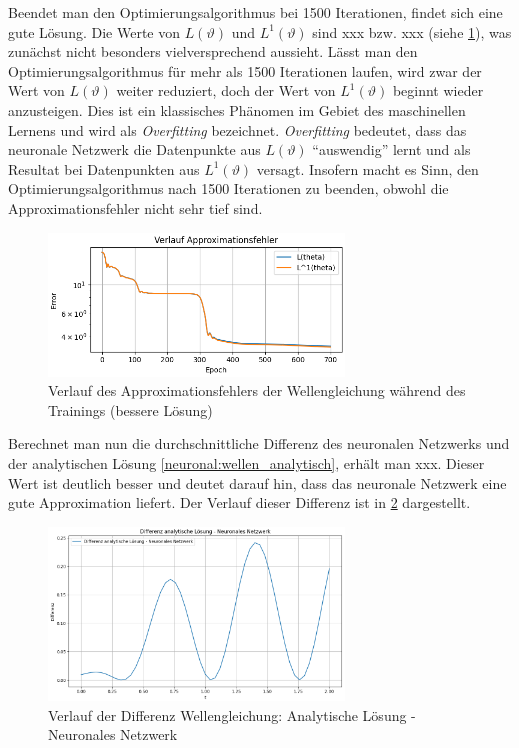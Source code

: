 Beendet man den Optimierungsalgorithmus bei 1500 Iterationen, findet sich eine gute Lösung.
Die Werte von $L(\vartheta)$ und $L^1(\vartheta)$ sind xxx bzw. xxx (siehe \ref{fig:fehler_wave_good}), was zunächst nicht besonders vielversprechend aussieht.
Lässt man den Optimierungsalgorithmus für mehr als 1500 Iterationen laufen, wird zwar der Wert von $L(\vartheta)$ weiter reduziert, doch der Wert von $L^1(\vartheta)$ beginnt wieder anzusteigen.
Dies ist ein klassisches Phänomen im Gebiet des maschinellen Lernens und wird als \emph{Overfitting} bezeichnet.
\emph{Overfitting} bedeutet, dass das neuronale Netzwerk die Datenpunkte aus $L(\vartheta)$ ``auswendig'' lernt und als Resultat bei Datenpunkten aus $L^1(\vartheta)$ versagt.
Insofern macht es Sinn, den Optimierungsalgorithmus nach 1500 Iterationen zu beenden, obwohl die Approximationsfehler nicht sehr tief sind.
\begin{figure}
    \centering
    \hspace*{-0.1\textwidth}
    \includegraphics[width=0.7\textwidth]{papers/neuronal/images/approximation_error_wave_good.png}
    \caption{Verlauf des Approximationsfehlers der Wellengleichung während des Trainings (bessere Lösung)}
    \label{fig:fehler_wave_good}
\end{figure}

Berechnet man nun die durchschnittliche Differenz des neuronalen Netzwerks und der analytischen Lösung \eqref{neuronal:wellen_analytisch}, erhält man xxx.
Dieser Wert ist deutlich besser und deutet darauf hin, dass das neuronale Netzwerk eine gute Approximation liefert. 
Der Verlauf dieser Differenz ist in \ref{fig:differenz_wellen} dargestellt.
\begin{figure}
    \centering
    \includegraphics[width=0.7\textwidth]{papers/neuronal/images/wellen_analytisch_neuronal.png}
    \caption{Verlauf der Differenz Wellengleichung: Analytische Lösung - Neuronales Netzwerk}
    \label{fig:differenz_wellen}
\end{figure}

